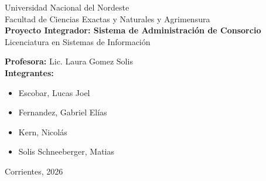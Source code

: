 \documentclass[a4paper,11pt]{article}
\begin{document}
\begin{titlepage}
    \centering
    \vspace*{1cm}
    {\large Universidad Nacional del Nordeste} \\
    {\large Facultad de Ciencias Exactas y Naturales y Agrimensura} \\
    \vspace{2cm}
    {\LARGE \textbf{Proyecto Integrador: Sistema de Administración de Consorcio}} \\
    \vspace{1cm}
    {\large Licenciatura en Sistemas de Información} \\
    \vspace{2cm}
    \vspace{2cm}
    \begin{flushleft}
        \textbf{Profesora:} Lic. Laura Gomez Solis \\
        \textbf{Integrantes:} \\
        \begin{itemize}
            \item Escobar, Lucas Joel
            \item Fernandez, Gabriel Elías
            \item Kern, Nicolás
            \item Solis Schneeberger, Matias
        \end{itemize}
    \end{flushleft}
    \vfill
    \vfill
    {\large Corrientes, 2026}
\end{titlepage}

\tableofcontents
\newpage
\listoffigures
\newpage


\newpage


\newpage


\end{document}
